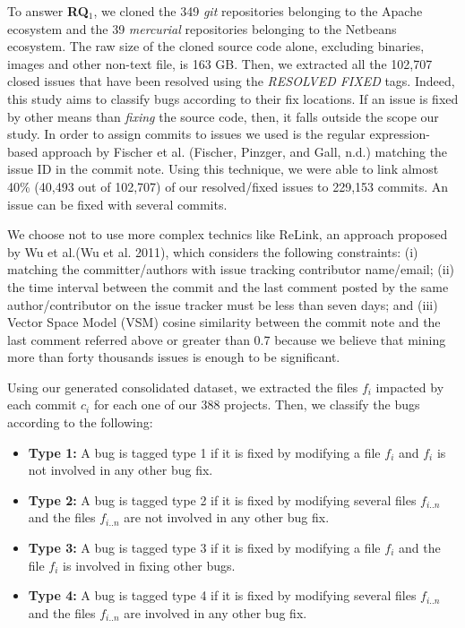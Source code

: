 \documentclass[natbib]{svjour3}
\providecommand{\tightlist}{%
  \setlength{\itemsep}{0pt}\setlength{\parskip}{0pt}}
\begin{document}
To answer \textbf{RQ\(_1\)}, we cloned the 349 \emph{git} repositories
belonging to the Apache ecosystem and the 39 \emph{mercurial}
repositories belonging to the Netbeans ecosystem. The raw size of the
cloned source code alone, excluding binaries, images and other non-text
file, is 163 GB. Then, we extracted all the 102,707 closed issues that
have been resolved using the \emph{RESOLVED FIXED} tags. Indeed, this
study aims to classify bugs according to their fix locations. If an
issue is fixed by other means than \emph{fixing} the source code, then,
it falls outside the scope our study. In order to assign commits to
issues we used is the regular expression-based approach by Fischer et
al. (Fischer, Pinzger, and Gall, n.d.) matching the issue ID in the
commit note. Using this technique, we were able to link almost 40\%
(40,493 out of 102,707) of our resolved/fixed issues to 229,153 commits.
An issue can be fixed with several commits.

We choose not to use more complex technics like ReLink, an approach
proposed by Wu et al.(Wu et al. 2011), which considers the following
constraints: (i) matching the committer/authors with issue tracking
contributor name/email; (ii) the time interval between the commit and
the last comment posted by the same author/contributor on the issue
tracker must be less than seven days; and (iii) Vector Space Model (VSM)
cosine similarity between the commit note and the last comment referred
above or greater than 0.7 because we believe that mining more than forty
thousands issues is enough to be significant.

Using our generated consolidated dataset, we extracted the files \(f_i\)
impacted by each commit \(c_i\) for each one of our 388 projects. Then,
we classify the bugs according to the following:

\begin{itemize}
\tightlist
\item
  \textbf{Type 1:} A bug is tagged type 1 if it is fixed by modifying a
  file \(f_i\) and \(f_i\) is not involved in any other bug fix.
\item
  \textbf{Type 2:} A bug is tagged type 2 if it is fixed by modifying
  several files \(f_{i..n}\) and the files \(f_{i..n}\) are not involved
  in any other bug fix.
\item
  \textbf{Type 3:} A bug is tagged type 3 if it is fixed by modifying a
  file \(f_{i}\) and the file \(f_{i}\) is involved in fixing other
  bugs.
\item
  \textbf{Type 4:} A bug is tagged type 4 if it is fixed by modifying
  several files \(f_{i..n}\) and the files \(f_{i..n}\) are involved in
  any other bug fix.
\end{itemize}
\end{document}
